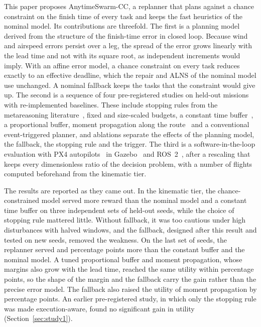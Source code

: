 This paper proposes AnytimeSwarm-CC, a replanner that plans against a chance constraint on the finish time of every
task and keeps the fast heuristics of the nominal model. Its contributions are threefold. The first is a planning model
derived from the structure of the finish-time error in closed loop. Because wind and airspeed errors persist over a leg,
the spread of the error grows linearly with the lead time and not with its square root, as independent increments
would imply. With an affine error model, a chance constraint on every task reduces exactly to an effective deadline,
which the repair and ALNS of the nominal model use unchanged. A nominal fallback keeps the tasks that the constraint
would give up. The second is a sequence of four pre-registered studies on held-out missions with re-implemented
baselines. These include stopping rules from the metareasoning
literature~\cite{boddy1994deliberation,zilberstein1996using,svegliato2018meta}, fixed and size-scaled budgets, a
constant time buffer~\cite{agra2013robust}, a proportional buffer, moment propagation along the
route~\cite{ehmke2015ensuring} and a conventional event-triggered planner, and ablations separate the effects of the
planning model, the fallback, the stopping rule and the trigger. The third is a software-in-the-loop evaluation with PX4
autopilots~\cite{meier2015px4} in Gazebo~\cite{koenig2004gazebo} and ROS~2~\cite{macenski2022ros2}, after a rescaling
that keeps every dimensionless ratio of the decision problem, with a number of flights computed beforehand from the
kinematic tier.

The results are reported as they came out. In the kinematic tier, the chance-constrained model served more reward than
the nominal model and a constant time buffer on three independent sets of held-out seeds, while the choice of stopping
rule mattered little. Without fallback, it was too cautious under high disturbances with halved windows, and the
fallback, designed after this result and tested on new seeds, removed the weakness. On the last set of seeds, the
replanner served  and  percentage points more than the constant buffer and the
nominal model. A tuned proportional buffer and moment propagation, whose margins also grow with the lead time, reached
the same utility within  percentage points, so the shape of the margin and the fallback carry the
gain rather than the precise error model. The fallback also raised the utility of moment propagation by
 percentage points. %
An earlier pre-registered study, in which only the stopping rule was made execution-aware, found no significant gain in
utility (Section~\ref{sec:study1}).
